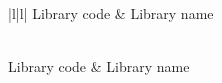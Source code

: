 \documentclass[letterpaper,10pt,english]{sphinxmanual}
\begin{document}
\begin{savenotes}\sphinxatlongtablestart\begin{longtable}{|l|l|}
\hline
\sphinxstyletheadfamily 
Library code
&\sphinxstyletheadfamily 
Library name
\\
\hline
\endfirsthead

%
{}\\
\hline
\sphinxstyletheadfamily 
Library code
&\sphinxstyletheadfamily 
Library name
\\
\hline
\endhead

\hline
{}\\
\endfoot

\endlastfoot


\end{longtable}
\end{savenotes}
\end{document}
